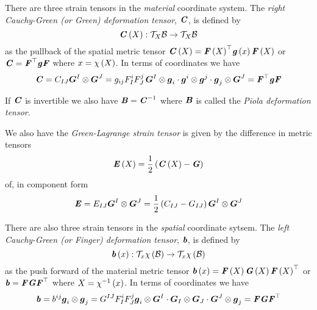 There are three strain tensors in the \emph{material} coordinate system. The
\emph{right Cauchy-Green (or Green) deformation tensor}, $\tensor{C}$, is
defined by
\begin{equation}
  \mapping{\fnof{\tensor{C}}{X}}{\tangentspace{\embedmanifold{B}}{X}}{\tangentspace{\embedmanifold{B}}{X}}
\end{equation}
as the pullback of the spatial metric tensor \ie $\fnof{\tensor{C}}{X}=\transpose{\fnof{\tensor{F}}{X}}\fnof{\tensor{g}}{x}\fnof{\tensor{F}}{X}$
or $\tensor{C}=\transpose{\tensor{F}}\tensor{g}\tensor{F}$ where $x=\fnof{\chi}{X}$. In terms of coordinates we
have
\begin{equation}
  \tensor{C}=C_{IJ}\tensorprod{\vectr{G}^{I}}{\vectr{G}^{J}}=g_{ij}F^{i}_{I}F^{j}_{J}\,\dotprodthree{\tensorprod{\vectr{G}^{I}}{\vectr{g}_{i}}}{\tensorprod{\vectr{g}^{i}}{\vectr{g}^{j}}}{\tensorprod{\vectr{g}_{j}}{\vectr{G}^{J}}}=\transpose{\tensor{F}}\tensor{g}\tensor{F}
\end{equation}

If $\tensor{C}$ is invertible we also have $\tensor{B}=\inverse{\tensor{C}}$
where $\tensor{B}$ is called the \emph{Piola deformation
  tensor}.

We also have the \emph{Green-Lagrange strain tensor} is given by the difference
in metric tensors
\begin{equation}
  \fnof{\tensor{E}}{X}=\frac{1}{2}\pbrac{\fnof{\tensor{C}}{X}-\tensor{G}}
\end{equation}
of, in component form
\begin{equation}
  \tensor{E}=E_{IJ}\tensorprod{\vectr{G}^{I}}{\vectr{G}^{J}}=\frac{1}{2}\pbrac{C_{IJ}-G_{IJ}}\tensorprod{\vectr{G}^{I}}{\vectr{G}^{J}}
\end{equation}

There are also three strain tensors in the \emph{spatial} coordinate
sytsem. The \emph{left Cauchy-Green (or Finger) deformation tensor},
$\tensor{b}$, is defined by
\begin{equation}
  \mapping{\fnof{\tensor{b}}{x}}{\tangentspace{\fnof{\chi}{\embedmanifold{B}}}{x}}{\tangentspace{\fnof{\chi}{\embedmanifold{B}}}{x}}
\end{equation}
as the push forward of the material metric tensor \ie
$\fnof{\tensor{b}}{x}=\fnof{\tensor{F}}{X}\fnof{\tensor{G}}{X}\transpose{\fnof{\tensor{F}}{X}}$
or $\tensor{b}=\tensor{F}\tensor{G}\transpose{\tensor{F}}$ where
$X=\fnof{\inverse{\chi}}{x}$. In terms of coordinates we have
\begin{equation}
  \tensor{b}=b^{ij}\tensorprod{\vectr{g}_{i}}{\vectr{g}_{j}}=G^{IJ}F^{i}_{I}F^{j}_{J}\dotprodthree{\tensorprod{\vectr{g}_{i}}{\vectr{G}^{I}}}{\tensorprod{\vectr{G}_{I}}{\vectr{G}_{J}}}{\tensorprod{\vectr{G}^{J}}{\vectr{g}_{j}}}=\tensor{F}\tensor{G}\transpose{\tensor{F}}
\end{equation}

